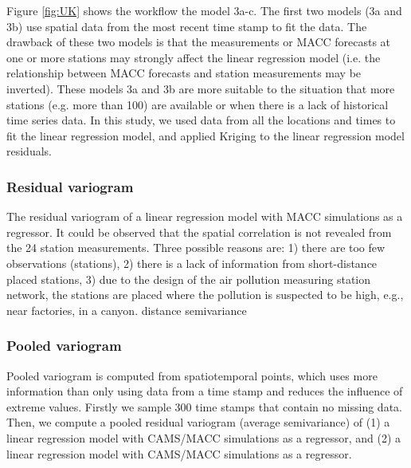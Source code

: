 \documentclass{article}
\begin{document}
Figure \ref{fig:UK}  shows the workflow the model 3a-c. The first
two models (3a and 3b) use spatial data from the most recent time
stamp to fit the data. The drawback of these two models is that the
measurements or MACC forecasts at one or more stations may strongly
affect the linear regression model (i.e. the relationship between MACC
forecasts and station measurements may be inverted). These models 3a
and 3b are more suitable to the situation that more stations
(e.g. more than 100) are available or when there is a lack of
historical time series data. In this study, we used data from all the
locations and times to fit the linear regression model, and applied
Kriging to the linear regression model residuals.


 
\subsubsection{Residual variogram} 

The residual variogram of a linear regression model with MACC
simulations as a regressor.  It could be observed that the spatial
correlation is not revealed from the 24 station measurements. Three
possible reasons are: 1) there are too few observations (stations), 2)
there is a lack of information from short-distance placed stations, 3)
due to the design of the air pollution measuring station network, the
stations are placed where the pollution is suspected to be high, e.g.,
near factories, in a canyon.  distance semivariance
 

\subsubsection{Pooled variogram}

Pooled variogram is computed from spatiotemporal points, which uses
more information than only using data from a time stamp and reduces
the influence of extreme values.  Firstly we sample 300 time stamps
that contain no missing data. Then, we compute a pooled residual
variogram (average semivariance) of (1) a linear regression model with
CAMS/MACC simulations as a regressor, and (2) a linear regression
model with CAMS/MACC simulations as a regressor. 
\end{document}
